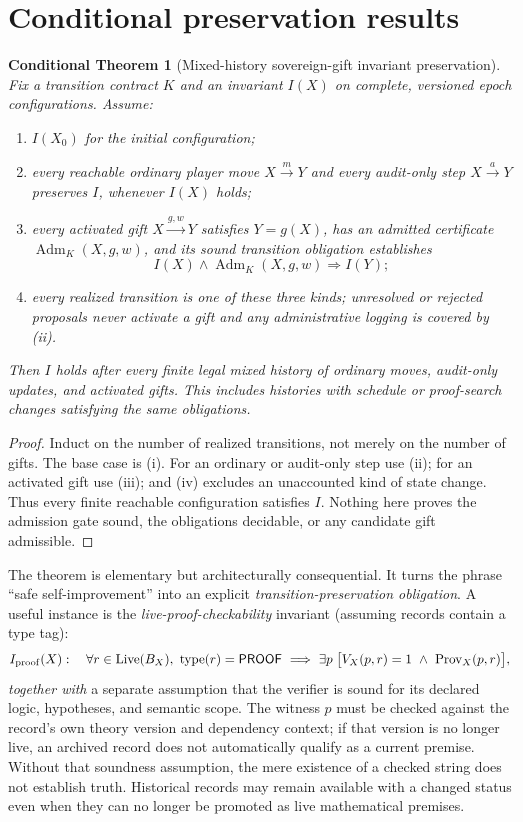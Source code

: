 \documentclass[11pt,letterpaper]{article}
\newtheorem{theorem}[definition]{Conditional Theorem}
\theoremstyle{remark}
\newcommand{\Adm}{\operatorname{Adm}}
\newcommand{\Prov}{\operatorname{Prov}}
\newcommand{\Live}{\operatorname{Live}}
\begin{document}
\section{Conditional preservation results}
\begin{theorem}[Mixed-history sovereign-gift invariant preservation]\label{thm:invariant}
Fix a transition contract $K$ and an invariant $I(X)$ on complete, versioned epoch configurations. Assume:
\begin{enumerate}[label=(\roman*)]
\item $I(X_0)$ for the initial configuration;
\item every reachable ordinary player move $X\xrightarrow{m}Y$ and every audit-only step $X\xrightarrow{a}Y$ preserves $I$, whenever $I(X)$ holds;
\item every activated gift $X\xrightarrow{g,w}Y$ satisfies $Y=g(X)$, has an admitted certificate $\Adm_K(X,g,w)$, and its sound transition obligation establishes
\[
I(X)\wedge\Adm_K(X,g,w)\Longrightarrow I(Y);
\]
\item every realized transition is one of these three kinds; unresolved or rejected proposals never activate a gift and any administrative logging is covered by (ii).
\end{enumerate}
Then $I$ holds after every finite legal mixed history of ordinary moves, audit-only updates, and activated gifts. This includes histories with schedule or proof-search changes satisfying the same obligations.
\end{theorem}
\begin{proof}
Induct on the number of realized transitions, not merely on the number of gifts. The base case is (i). For an ordinary or audit-only step use (ii); for an activated gift use (iii); and (iv) excludes an unaccounted kind of state change. Thus every finite reachable configuration satisfies $I$. Nothing here proves the admission gate sound, the obligations decidable, or any candidate gift admissible.
\end{proof}

The theorem is elementary but architecturally consequential. It turns the phrase ``safe self-improvement'' into an explicit \emph{transition-preservation obligation}. A useful instance is the \emph{live-proof-checkability} invariant (assuming records contain a type tag):
\begin{equation}\label{eq:ledger}
I_{\rm proof}(X):\quad
\forall r\in\Live(B_X),\ \operatorname{type}(r)=\mathsf{PROOF}\ \Longrightarrow\ 
\exists p\;\bigl[V_X(p,r)=1\ \wedge\ \Prov_X(p,r)\bigr],
\end{equation}
\emph{together with} a separate assumption that the verifier is sound for its declared logic, hypotheses, and semantic scope. The witness $p$ must be checked against the record's own theory version and dependency context; if that version is no longer live, an archived record does not automatically qualify as a current premise. Without that soundness assumption, the mere existence of a checked string does not establish truth. Historical records may remain available with a changed status even when they can no longer be promoted as live mathematical premises.
\end{document}

